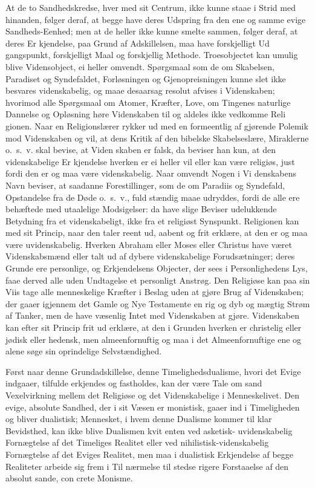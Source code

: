 \documentclass[12pt,a4paper]{article}
\newcommand{\opage}[1]{\marginnote{\footnotesize\textit{[#1]}}}
\begin{document}
At de to Sandhedskredse, hver med sit Centrum, ikke kunne
staae i Strid med hinanden, følger deraf, at begge have deres
Udspring fra den ene og samme evige Sandheds-Eenhed; men at
de heller ikke kunne smelte sammen, følger deraf, at deres Er\-%
kjendelse, paa Grund af Adskillelsen, maa have forskjelligt Ud\-%
gangspunkt, forskjelligt Maal og forskjellig Methode. Troesobjectet
kan umulig blive Vidensobject, ei heller omvendt. Spørgsmaal
som de om Skabelsen, Paradiset og Syndefaldet, Forløsningen og
Gjenopreisningen kunne slet ikke besvares videnskabelig, og maae
desaarsag resolut afvises i Videnskaben; hvorimod alle Spørgsmaal
\opage{16}om Atomer, Kræfter, Love, om Tingenes naturlige Dannelse og
Opløsning høre Videnskaben til og aldeles ikke vedkomme Reli\-%
gionen. Naar en Religionslærer rykker ud med en formeentlig af\-%
gjørende Polemik mod Videnskaben og vil, at dens Kritik af den
bibelske Skabelseslære, Miraklerne o.\ s.\ v. skal bevise, at Viden\-%
skaben er falsk, da beviser han kun, at den videnskabelige Er\-%
kjendelse hverken er ei heller vil eller kan være religiøs, just fordi
den er og maa være videnskabelig. Naar omvendt Nogen i Vi\-%
denskabens Navn beviser, at saadanne Forestillinger, som de om
Paradiis og Syndefald, Opstandelse fra de Døde o.\ s.\ v., fuld\-%
stændig maae udryddes, fordi de alle ere behæftede med utaalelige
Modsigelser: da have slige Beviser udelukkende Betydning fra et
videnskabeligt, ikke fra et religiøst Synspunkt. Religionen kan
med sit Princip, naar den taler reent ud, aabent og frit erklære,
at den er og maa være uvidenskabelig. Hverken Abraham eller
Moses eller Christus have været Videnskabsmænd eller talt ud af
dybere videnskabelige Forudsætninger; deres Grunde ere personlige,
og Erkjendelsens Objecter, der sees i Personlighedens Lys, faae
derved alle uden Undtagelse et personligt Anstrøg. Den Religiøse
kan paa sin Viis tage alle menneskelige Kræfter i Beslag uden
at gjøre Brug af Videnskaben; der gaaer igjennem det Gamle og
Nye Testamente en rig og dyb og mægtig Strøm af Tanker, men
de have væsenlig Intet med Videnskaben at gjøre. Videnskaben
kan efter sit Princip frit ud erklære, at den i Grunden hverken
er christelig eller jødisk eller hedensk, men almeenfornuftig og
maa i det Almeenfornuftige ene og alene søge sin oprindelige
Selvstændighed.

Først naar denne Grundadskillelse, denne Timelighedsdualisme,
hvori det Evige indgaaer, tilfulde erkjendes og fastholdes, kan der
være Tale om sand Vexelvirkning mellem det Religiøse og det
Videnskabelige i Menneskelivet. Den evige, absolute Sandhed,
der i sit Væsen er monistisk, gaaer ind i Timeligheden og bliver
dualistisk; Mennesket, i hvem denne Dualisme kommer til klar
Bevidsthed, kan ikke blive Dualismen kvit enten ved asketisk-%
uvidenskabelig Fornægtelse af det Timeliges Realitet eller ved
\opage{17}nihilistisk-videnskabelig Fornægtelse af det Eviges Realitet, men maa
i dualistisk Erkjendelse af begge Realiteter arbeide sig frem i Til\-%
nærmelse til stedse rigere Forstaaelse af den absolut sande, con\-%
crete Monisme.
\end{document}
